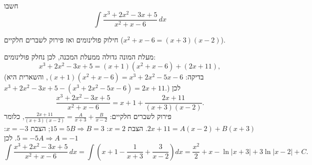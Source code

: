 
\begin{question}
חשבו
\[ \int\frac{x^3+2x^2-3x+5}{x^2+x-6}\,dx \]
\end{question}

\begin{hint}
חילוק פולינומים ואז פירוק לשברים חלקיים ($x^2+x-6=(x+3)(x-2)$).
\end{hint}

\begin{solution}
מעלת המונה גדולה ממעלת המכנה, לכן נחלק פולינומים:
\[ x^3+2x^2-3x+5=(x+1)(x^2+x-6)+(2x+11), \]
(בדיקה: $(x+1)(x^2+x-6)=x^3+2x^2-5x-6$, והשארית היא $x^3+2x^2-3x+5-(x^3+2x^2-5x-6)=2x+11$.) לכן
\[ \frac{x^3+2x^2-3x+5}{x^2+x-6}=x+1+\frac{2x+11}{(x+3)(x-2)}. \]
פירוק לשברים חלקיים: $\frac{2x+11}{(x+3)(x-2)}=\frac{A}{x+3}+\frac{B}{x-2}$, כלומר $2x+11=A(x-2)+B(x+3)$. הצבת $x=2$: $15=5B\Rightarrow B=3$; הצבת $x=-3$: $5=-5A\Rightarrow A=-1$. לכן
\[ \int\frac{x^3+2x^2-3x+5}{x^2+x-6}\,dx=\int\left(x+1-\frac1{x+3}+\frac3{x-2}\right)dx=\boxed{\frac{x^2}{2}+x-\ln|x+3|+3\ln|x-2|+C}. \]
\end{solution}

